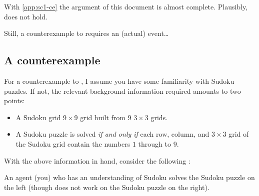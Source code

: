 \begin{note}
  With \autoref{app:sc1-ce} the argument of this document is almost complete.
  Plausibly, \issueInclusion{} does not hold.

  Still, a counterexample to \issueInclusion{} requires an (actual) event\dots
\end{note}



\subsection{A counterexample}
\label{sec:counterexample}


\begin{note}
  For a counterexample to \issueInclusion{}, I assume you have some familiarity with Sudoku puzzles.
  If not, the relevant background information required amounts to two points:
  \begin{itemize}
  \item
    A Sudoku grid \(9 \times 9\) grid built from \(9\) \(3 \times 3\) grids.
  \item
    A Sudoku puzzle is solved \emph{if and only if} each row, column, and \(3 \times 3\) grid of the Sudoku grid contain the numbers \(1\) through to \(9\).
  \end{itemize}
  With the above information in hand, consider the following :

  \begin{scenario}%
    \label{illu:gist:sudoku}%
    An agent (you) who has an understanding of Sudoku solves the Sudoku puzzle on the left (though does not work on the Sudoku puzzle on the right).
    \bigskip


\end{scenario}
\end{note}
